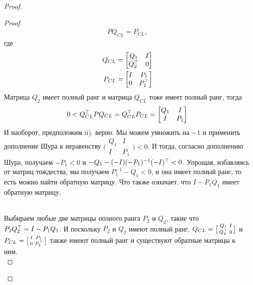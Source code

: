 \begin{proof}
\begin{proof}
	\begin{align}
		{P}{Q}_{CL}={P}_{CL},
	\end{align}
	где
	\begin{align}
		{Q}_{CL}=
		\begin{bmatrix}
			{Q}_{1} & {I}\\
			{Q}_{2}^\top & 0
		\end{bmatrix}\\
		{P}_{CL}=
		\begin{bmatrix}
			{I} & {P}_{1} \\
			0 & {P}_{2}^\top
		\end{bmatrix}
	\end{align}
	Матрица ${Q}_{2}$ имеет полный ранг и матрица ${Q}_{CL}$ тоже имеет полный ранг, тогда
	\begin{align}
		0<{Q}_{CL}^\top {P} {Q}_{CL} = {Q}_{CL}^\top {P}_{CL} = 
		\begin{bmatrix} 
			{Q}_{1} & I \\ 
			I & {P}_{1}
		\end{bmatrix}
	\end{align}
	И наоборот, предположим ii). верно. Мы можем умножить на $-1$ и применить дополнение Шура к неравенству 
	$\bigl( \begin{smallmatrix} 
		{Q}_{1} & I \\ 
		I & {P}_{1}\end{smallmatrix} \bigr) <0$. 
	И тогда, согласно дополнению Шура, получаем $-{P}_{1}<0$ и $-{Q}_{1}-(-{I})(-{P}_{1})^{-1}(-{I})^\top<0$. Упрощая, избавляясь от матриц тождества, мы получаем ${P}_{1}^{-1}-{Q}_{1}<0$, и она имеет полный ранг, то есть можно найти обратную матрицу. Что также означает, что ${I}-{P}_{1}{Q}_{1}$ имеет обратную матрицу.\\\
	
	Выбираем любые две матрицы полного ранга ${P}_{2}$ и ${Q}_{2}$, такие что ${P}_{2}{Q}_{2}^\top={I}-{P}_{1}{Q}_{1}$. И поскольку ${P}_2$ и ${Q}_2$ имеют полный ранг, ${Q}_{CL}=\bigl[\begin{smallmatrix}  
		{Q}_{1} & {I}\\
		{Q}_{2}^\top & 0
	\end{smallmatrix} \bigr]$ и 
	${P}_{CL}=\bigl[ \begin{smallmatrix}
		{I} & {P}_{1} \\
		0 & {P}_{2}^\top
	\end{smallmatrix} \bigr]$ также имеют полный ранг и существуют обратные матрицы к ним.\\
	

\end{proof}
\end{proof}
